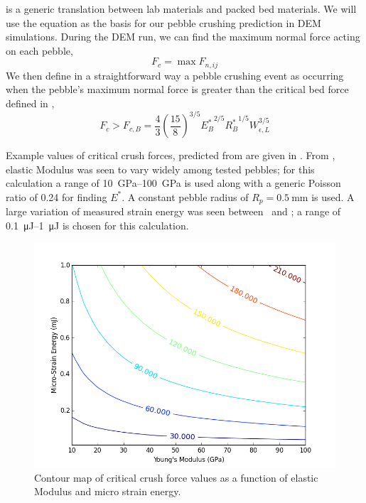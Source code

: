  is a generic translation between lab materials and packed bed materials. We will use the equation as the basis for our pebble crushing prediction in DEM simulations. During the DEM run, we can find the maximum normal force acting on each pebble,
\begin{equation}\label{eq:find_fmax}
	F_{c} = \max F_{n,ij}
\end{equation}
We then define in a straightforward way a pebble crushing event as occurring when the pebble's maximum normal force is greater than the critical bed force defined in ,
\begin{equation}\label{eq:crush-predict}
  F_{c} > F_{c,B} = \frac{4}{3}\left(\frac{15}{8}\right)^{3/5}{E_B^*}^{2/5}{R_B^*}^{1/5}W_{\epsilon,L}^{3/5}
\end{equation}

Example values of critical crush forces, predicted from  are given in . From , elastic Modulus was seen to vary widely among tested pebbles; for this calculation a range of \SIrange{10}{100}{\giga\pascal} is used along with a generic Poisson ratio of \num{0.24} for finding $E^*$. A constant pebble radius of $R_p = \SI{0.5}{\milli\meter}$ is used. A large variation of measured strain energy was seen between \lis~and \lit; a range of \SIrange{0.1}{1}{\micro\joule} is chosen for this calculation.

\begin{figure}[ht]
\centering
    \includegraphics[width=\doubleimagewidth]{figures/crush-force-contours.png}
    \caption{Contour map of critical crush force values as a function of elastic Modulus and micro strain energy.}
    \label{fig:crush-force-contours}
\end{figure}

